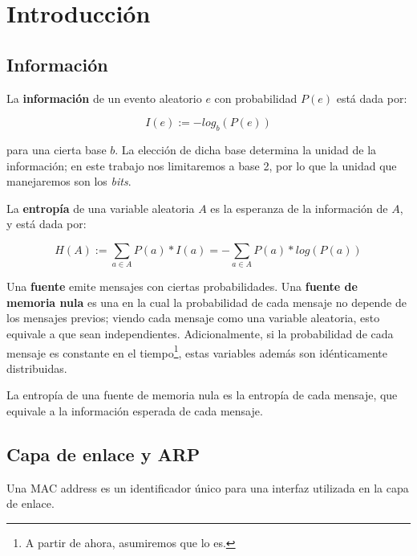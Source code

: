 \section{Introducci\'on}

\subsection{Información}

\par La \textbf{información} de un evento aleatorio $e$ con probabilidad $P(e)$ está dada por:

\begin{equation*}
    I(e) := -log_b(P(e))
\end{equation*}

para una cierta base $b$. 
La elección de dicha base determina la unidad de la información; en este trabajo nos limitaremos a base 2, por lo que la unidad que manejaremos son los \textit{bits}. 

\par La \textbf{entropía} de una variable aleatoria $A$ es la esperanza de la información de $A$, y está dada por:

\begin{equation*}
    H(A) := \sum_{a \in A}{P(a) * I(a)} = - \sum_{a \in A}{P(a) * log(P(a))}
\end{equation*}

\par Una \textbf{fuente} emite mensajes con ciertas probabilidades.
Una \textbf{fuente de memoria nula} es una en la cual la probabilidad de cada mensaje no depende de los mensajes previos; viendo cada mensaje como una variable aleatoria, esto equivale a que sean independientes.
Adicionalmente, si la probabilidad de cada mensaje es constante en el tiempo\footnote{A partir de ahora, asumiremos que lo es.}, estas variables además son idénticamente distribuidas.

\par La entropía de una fuente de memoria nula es la entropía de cada mensaje, que equivale a la información esperada de cada mensaje.

\subsection{Capa de enlace y ARP}

\par Una MAC address es un identificador único para una interfaz utilizada en la capa de enlace.

